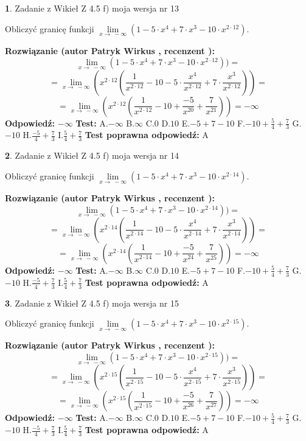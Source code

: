 \documentclass[12pt, a4paper]{article}
\theoremstyle{definition} %
\newtheorem{zad}{}
\newcommand{\zadStart}[1]{\begin{zad}#1\newline}
\newcommand{\zadStop}{\end{zad}}
\newcommand{\rozwStart}[2]{\noindent \textbf{Rozwiązanie (autor #1 , recenzent #2): }\newline}
\newcommand{\rozwStop}{\newline}
\newcommand{\odpStart}{\noindent \textbf{Odpowiedź:}\newline}
\newcommand{\odpStop}{\newline}
\newcommand{\testStart}{\noindent \textbf{Test:}\newline}
\newcommand{\testStop}{\newline}
\newcommand{\kluczStart}{\noindent \textbf{Test poprawna odpowiedź:}\newline}
\newcommand{\kluczStop}{\newline}
\begin{document}
\zadStart{Zadanie z Wikieł Z 4.5 f) moja wersja nr 13}



Obliczyć granicę funkcji  $\lim\limits_{x\to\ -\infty}(1 - 5 \cdot x^{4}+7 \cdot x^{3}- 10 \cdot x^{2\cdot12})$.
\zadStop
\rozwStart{Patryk Wirkus}{}
$$\lim\limits_{x\to\ -\infty}(1 - 5 \cdot x^{4}+7 \cdot x^{3}- 10 \cdot x^{2\cdot12}))=$$
$$=\lim\limits_{x\to\ -\infty}(x^{2\cdot12}(\frac{1}{x^{2\cdot12}}-10 -5 \cdot \frac{x^{4}}{x^{2\cdot12}}+7 \cdot \frac{x^{3}}{x^{2\cdot12}}))=$$
$$=\lim\limits_{x\to\ -\infty}(x^{2\cdot12}(\frac{1}{x^{2\cdot12}}-10 + \frac{-5}{x^{20}}+ \frac{7}{x^{21}}))=-\infty$$
\rozwStop
\odpStart
$-\infty$
\odpStop
\testStart
A.$-\infty$ B.$\infty$ C.$0$ D.$10$ E.$-5 + 7 - 10$
F.$-10+\frac{5}{4}+\frac{7}{3}$ G.$-10$
H.$\frac{-5}{4}+\frac{7}{3}$
I.$\frac{5}{4}+\frac{7}{3}$
\testStop
\kluczStart
A
\kluczStop



\zadStart{Zadanie z Wikieł Z 4.5 f) moja wersja nr 14}



Obliczyć granicę funkcji  $\lim\limits_{x\to\ -\infty}(1 - 5 \cdot x^{4}+7 \cdot x^{3}- 10 \cdot x^{2\cdot14})$.
\zadStop
\rozwStart{Patryk Wirkus}{}
$$\lim\limits_{x\to\ -\infty}(1 - 5 \cdot x^{4}+7 \cdot x^{3}- 10 \cdot x^{2\cdot14}))=$$
$$=\lim\limits_{x\to\ -\infty}(x^{2\cdot14}(\frac{1}{x^{2\cdot14}}-10 -5 \cdot \frac{x^{4}}{x^{2\cdot14}}+7 \cdot \frac{x^{3}}{x^{2\cdot14}}))=$$
$$=\lim\limits_{x\to\ -\infty}(x^{2\cdot14}(\frac{1}{x^{2\cdot14}}-10 + \frac{-5}{x^{24}}+ \frac{7}{x^{25}}))=-\infty$$
\rozwStop
\odpStart
$-\infty$
\odpStop
\testStart
A.$-\infty$ B.$\infty$ C.$0$ D.$10$ E.$-5 + 7 - 10$
F.$-10+\frac{5}{4}+\frac{7}{3}$ G.$-10$
H.$\frac{-5}{4}+\frac{7}{3}$
I.$\frac{5}{4}+\frac{7}{3}$
\testStop
\kluczStart
A
\kluczStop



\zadStart{Zadanie z Wikieł Z 4.5 f) moja wersja nr 15}



Obliczyć granicę funkcji  $\lim\limits_{x\to\ -\infty}(1 - 5 \cdot x^{4}+7 \cdot x^{3}- 10 \cdot x^{2\cdot15})$.
\zadStop
\rozwStart{Patryk Wirkus}{}
$$\lim\limits_{x\to\ -\infty}(1 - 5 \cdot x^{4}+7 \cdot x^{3}- 10 \cdot x^{2\cdot15}))=$$
$$=\lim\limits_{x\to\ -\infty}(x^{2\cdot15}(\frac{1}{x^{2\cdot15}}-10 -5 \cdot \frac{x^{4}}{x^{2\cdot15}}+7 \cdot \frac{x^{3}}{x^{2\cdot15}}))=$$
$$=\lim\limits_{x\to\ -\infty}(x^{2\cdot15}(\frac{1}{x^{2\cdot15}}-10 + \frac{-5}{x^{26}}+ \frac{7}{x^{27}}))=-\infty$$
\rozwStop
\odpStart
$-\infty$
\odpStop
\testStart
A.$-\infty$ B.$\infty$ C.$0$ D.$10$ E.$-5 + 7 - 10$
F.$-10+\frac{5}{4}+\frac{7}{3}$ G.$-10$
H.$\frac{-5}{4}+\frac{7}{3}$
I.$\frac{5}{4}+\frac{7}{3}$
\testStop
\kluczStart
A
\kluczStop
\end{document}

